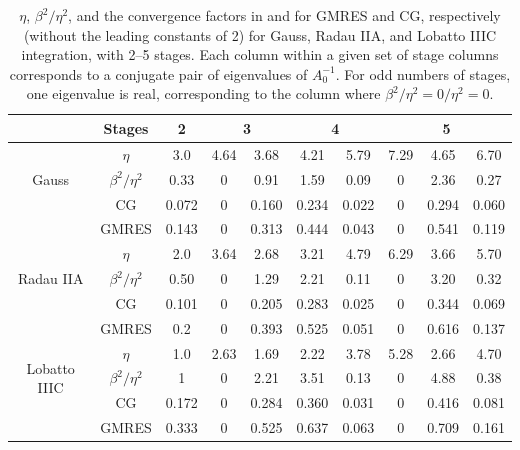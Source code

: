 \documentclass[review]{siamart}
\begin{document}
%
{
\renewcommand{\tabcolsep}{4pt}
\renewcommand{\arraystretch}{1.15}
\begin{table}[!ht]
  \centering
  \begin{tabular}{| c | c | c | cc | cc | ccc |}  %
  \hline
& Stages & 2 & \multicolumn{2}{c}{3} & \multicolumn{2}{|c}{4} & \multicolumn{3}{|c|}{5} \\\hline\hline
\multirow{ 3}{*}{Gauss}
&$\eta$ & 3.0 & 4.64 & 3.68 & 4.21 & 5.79 & 7.29 & 4.65 & 6.70 \\
&$\beta^2/\eta^2$ & 0.33 & 0 & 0.91 & 1.59 & 0.09 & 0 & 2.36 & 0.27 \\
&CG & 0.072 & 0 & 0.160 & 0.234 & 0.022 & 0 & 0.294 & 0.060 \\
&GMRES & 0.143 & 0 & 0.313 & 0.444 & 0.043 & 0 & 0.541 & 0.119  \\\hline
\multirow{ 3}{*}{Radau IIA}
&$\eta$ & 2.0 & 3.64 & 2.68 & 3.21 & 4.79 & 6.29 & 3.66 & 5.70 \\
&$\beta^2/\eta^2$ & 0.50 & 0 & 1.29 & 2.21 & 0.11 & 0 & 3.20 & 0.32	\\
&CG & 0.101 & 0 & 0.205 & 0.283 & 0.025 & 0 & 0.344 & 0.069 \\
&GMRES & 0.2 & 0 & 0.393 & 0.525 & 0.051 & 0 & 0.616 & 0.137 \\\hline
\multirow{ 3}{*}{Lobatto IIIC}
&$\eta$ & 1.0 & 2.63 & 1.69 & 2.22 & 3.78 & 5.28 & 2.66 & 4.70 \\
&$\beta^2/\eta^2$ & 1 & 0 & 2.21 & 3.51 & 0.13 & 0 & 4.88 & 0.38 \\
&CG & 0.172 & 0 & 0.284 & 0.360 & 0.031 & 0 & 0.416 & 0.081 \\
&GMRES & 0.333 & 0 & 0.525 & 0.637 & 0.063 & 0 &  0.709 & 0.161 \\
  \hline
  \end{tabular}
  \caption{$\eta$, $\beta^2/\eta^2$, and the convergence factors in 
  and  for GMRES and CG, respectively (without the leading constants of
  2) for Gauss, Radau IIA, and Lobatto IIIC integration,
  with 2--5 stages. Each column within a given set of stage columns corresponds to a
  conjugate pair of eigenvalues of $A_0^{-1}$. For odd numbers of stages, one eigenvalue
  is real, corresponding to the column where $\beta^2/\eta^2 = 0/\eta^2 = 0$.}\label{tab:beta}
\end{table}
}
\end{document}
